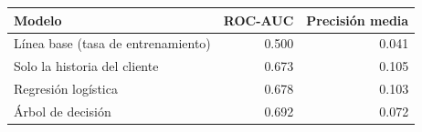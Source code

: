 \begin{tabular}{lrr}
\toprule
Modelo & ROC-AUC & Precisión media \\
\midrule
Línea base (tasa de entrenamiento) & 0.500 & 0.041 \\
Solo la historia del cliente & 0.673 & 0.105 \\
Regresión logística & 0.678 & 0.103 \\
Árbol de decisión & 0.692 & 0.072 \\
\bottomrule
\end{tabular}
